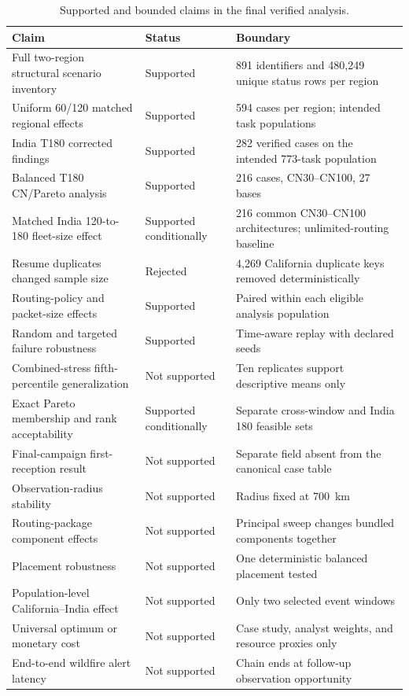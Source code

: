 \begin{table}[H]
\centering
\small
\caption{Supported and bounded claims in the final verified analysis.}
\label{tab:claim_ledger}
\begin{tabularx}{\textwidth}{Y L{0.18\textwidth}Y}
\toprule
Claim & Status & Boundary \\
\midrule
Full two-region structural scenario inventory & Supported & 891 identifiers and 480,249 unique status rows per region \\
Uniform 60/120 matched regional effects & Supported & 594 cases per region; intended task populations \\
India T180 corrected findings & Supported & 282 verified cases on the intended 773-task population \\
Balanced T180 CN/Pareto analysis & Supported & 216 cases, CN30--CN100, 27 bases \\
Matched India 120-to-180 fleet-size effect & Supported conditionally & 216 common CN30--CN100 architectures; unlimited-routing baseline \\
Resume duplicates changed sample size & Rejected & 4,269 California duplicate keys removed deterministically \\
Routing-policy and packet-size effects & Supported & Paired within each eligible analysis population \\
Random and targeted failure robustness & Supported & Time-aware replay with declared seeds \\
Combined-stress fifth-percentile generalization & Not supported & Ten replicates support descriptive means only \\
Exact Pareto membership and rank acceptability & Supported conditionally & Separate cross-window and India 180 feasible sets \\
Final-campaign first-reception result & Not supported & Separate field absent from the canonical case table \\
Observation-radius stability & Not supported & Radius fixed at \SI{700}{\kilo\metre} \\
Routing-package component effects & Not supported & Principal sweep changes bundled components together \\
Placement robustness & Not supported & One deterministic balanced placement tested \\
Population-level California--India effect & Not supported & Only two selected event windows \\
Universal optimum or monetary cost & Not supported & Case study, analyst weights, and resource proxies only \\
End-to-end wildfire alert latency & Not supported & Chain ends at follow-up observation opportunity \\
\bottomrule
\end{tabularx}
\end{table}

